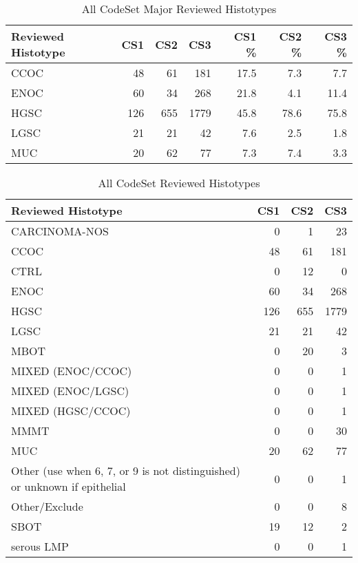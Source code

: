 \documentclass[
]{report}
\begin{document}
\begin{table}

\caption{\label{tab:dist-major-hist}All CodeSet Major Reviewed Histotypes}
\centering
\begin{tabular}[t]{l|r|r|r|r|r|r}
\hline
Reviewed Histotype & CS1 & CS2 & CS3 & CS1 \% & CS2 \% & CS3 \%\\
\hline
CCOC & 48 & 61 & 181 & 17.5 & 7.3 & 7.7\\
\hline
ENOC & 60 & 34 & 268 & 21.8 & 4.1 & 11.4\\
\hline
HGSC & 126 & 655 & 1779 & 45.8 & 78.6 & 75.8\\
\hline
LGSC & 21 & 21 & 42 & 7.6 & 2.5 & 1.8\\
\hline
MUC & 20 & 62 & 77 & 7.3 & 7.4 & 3.3\\
\hline
\end{tabular}
\end{table}

\begin{table}

\caption{\label{tab:dist-all}All CodeSet Reviewed Histotypes}
\centering
\begin{tabular}[t]{l|r|r|r}
\hline
Reviewed Histotype & CS1 & CS2 & CS3\\
\hline
CARCINOMA-NOS & 0 & 1 & 23\\
\hline
CCOC & 48 & 61 & 181\\
\hline
CTRL & 0 & 12 & 0\\
\hline
ENOC & 60 & 34 & 268\\
\hline
HGSC & 126 & 655 & 1779\\
\hline
LGSC & 21 & 21 & 42\\
\hline
MBOT & 0 & 20 & 3\\
\hline
MIXED (ENOC/CCOC) & 0 & 0 & 1\\
\hline
MIXED (ENOC/LGSC) & 0 & 0 & 1\\
\hline
MIXED (HGSC/CCOC) & 0 & 0 & 1\\
\hline
MMMT & 0 & 0 & 30\\
\hline
MUC & 20 & 62 & 77\\
\hline
Other (use when 6, 7, or 9 is not distinguished) or unknown if epithelial & 0 & 0 & 1\\
\hline
Other/Exclude & 0 & 0 & 8\\
\hline
SBOT & 19 & 12 & 2\\
\hline
serous LMP & 0 & 0 & 1\\
\hline
\end{tabular}
\end{table}
\end{document}
